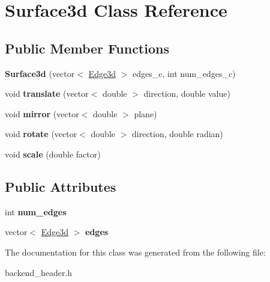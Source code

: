 \hypertarget{classSurface3d}{}\section{Surface3d Class Reference}
\label{classSurface3d}
\subsection*{Public Member Functions}
\begin{DoxyCompactItemize}
\item 
{\bfseries Surface3d} (vector$<$ \hyperlink{classEdge3d}{Edge3d} $>$ edges\+\_\+c, int num\+\_\+edges\+\_\+c)\hypertarget{classSurface3d_a51aed86e66d73b012f0dbed3b437ec34}{}\label{classSurface3d_a51aed86e66d73b012f0dbed3b437ec34}

\item 
void {\bfseries translate} (vector$<$ double $>$ direction, double value)\hypertarget{classSurface3d_a72590543a4a60dedd9a932b50679b2ca}{}\label{classSurface3d_a72590543a4a60dedd9a932b50679b2ca}

\item 
void {\bfseries mirror} (vector$<$ double $>$ plane)\hypertarget{classSurface3d_a74ebcdd68b39cd0e59712164b4796b6c}{}\label{classSurface3d_a74ebcdd68b39cd0e59712164b4796b6c}

\item 
void {\bfseries rotate} (vector$<$ double $>$ direction, double radian)\hypertarget{classSurface3d_a625754b5b8f818559b343c4765e07ac3}{}\label{classSurface3d_a625754b5b8f818559b343c4765e07ac3}

\item 
void {\bfseries scale} (double factor)\hypertarget{classSurface3d_ac121aeaa939ad5a4dbf599d1b9d80e33}{}\label{classSurface3d_ac121aeaa939ad5a4dbf599d1b9d80e33}

\end{DoxyCompactItemize}
\subsection*{Public Attributes}
\begin{DoxyCompactItemize}
\item 
int {\bfseries num\+\_\+edges}\hypertarget{classSurface3d_a2e7b3c2dab341367ce52235b16756067}{}\label{classSurface3d_a2e7b3c2dab341367ce52235b16756067}

\item 
vector$<$ \hyperlink{classEdge3d}{Edge3d} $>$ {\bfseries edges}\hypertarget{classSurface3d_aad04d4bf228a38ec219f0fa1b5272ef8}{}\label{classSurface3d_aad04d4bf228a38ec219f0fa1b5272ef8}

\end{DoxyCompactItemize}


The documentation for this class was generated from the following file\+:\begin{DoxyCompactItemize}
\item 
backend\+\_\+header.\+h\end{DoxyCompactItemize}
